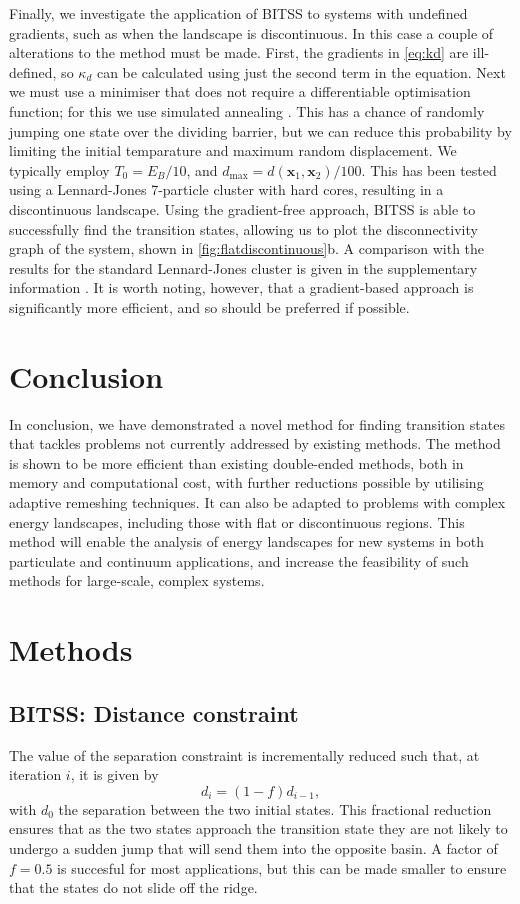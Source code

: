 \documentclass[twocolumn,10pt]{revtex4-2}
\begin{document}
Finally, we investigate the application of BITSS to systems with undefined gradients, such as when the landscape is discontinuous.
In this case a couple of alterations to the method must be made.
First, the gradients in \cref{eq:kd} are ill-defined, so $\kappa_d$ can be calculated using just the second term in the equation.
Next we must use a minimiser that does not require a differentiable optimisation function; for this we use simulated annealing \cite{Kirkpatrick1983}.
This has a chance of randomly jumping one state over the dividing barrier, but we can reduce this probability by limiting the initial temparature and maximum random displacement. We typically employ $T_0 = E_B / 10$, and $d_\text{max} = d(\bm{x}_1, \bm{x}_2) / 100$.
This has been tested using a Lennard-Jones 7-particle cluster with hard cores, resulting in a discontinuous landscape.
Using the gradient-free approach, BITSS is able to successfully find the transition states, allowing us to plot the disconnectivity graph of the system, shown in \cref{fig:flatdiscontinuous}b.
A comparison with the results for the standard Lennard-Jones cluster is given in the supplementary information \cite{Note1}.
It is worth noting, however, that a gradient-based approach is significantly more efficient, and so should be preferred if possible.


\section{Conclusion}
In conclusion, we have demonstrated a novel method for finding transition states that tackles problems not currently addressed by existing methods.
The method is shown to be more efficient than existing double-ended methods, both in memory and computational cost, with further reductions possible by utilising adaptive remeshing techniques.
It can also be adapted to problems with complex energy landscapes, including those with flat or discontinuous regions.
This method will enable the analysis of energy landscapes for new systems in both particulate and continuum applications, and increase the feasibility of such methods for large-scale, complex systems.


\section{Methods}
\subsection{BITSS: Distance constraint}
The value of the separation constraint is incrementally reduced such that, at iteration $i$, it is given by
\begin{equation}\label{eq:diteration}
  d_i = (1 - f) d_{i-1},
\end{equation}
with $d_0$ the separation between the two initial states.
This fractional reduction ensures that as the two states approach the transition state they are not likely to undergo a sudden jump that will send them into the opposite basin.
A factor of $f = 0.5$ is succesful for most applications, but this can be made smaller to ensure that the states do not slide off the ridge.
\end{document}
